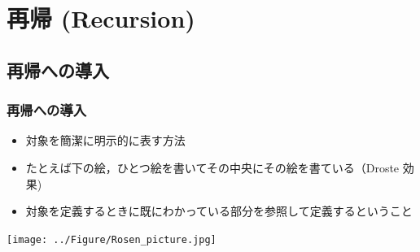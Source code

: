\section{再帰 (Recursion)}
\subsection{再帰への導入}
\begin{frame}[fragile]
\frametitle{再帰への導入}
  \begin{itemize}
\item 対象を簡潔に明示的に表す方法
\item たとえば下の絵，ひとつ絵を書いてその中央にその絵を書ている（Droste 効果)
\item 対象を定義するときに既にわかっている部分を参照して定義するということ

  \end{itemize}
  \begin{center}
\texttt{[image: ../Figure/Rosen\_picture.jpg]}
  \end{center}
\end{frame}
